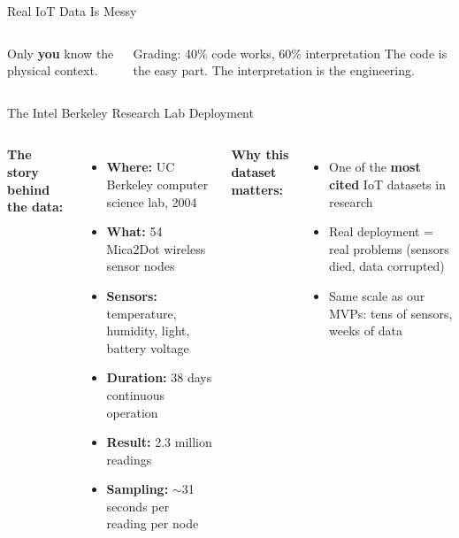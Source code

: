 \documentclass[aspectratio=169,11pt]{beamer}
\begin{document}
\begin{frame}[shrink=5]{Real IoT Data Is Messy}
\begin{columns}
{\begin{minipage}{0.9\textwidth}
            \vspace{0.1cm}
            Only \textbf{you} know the physical context.
            \vspace{0.1cm}
        \end{minipage}
        }

        \vspace{0.1cm}
        \begin{alertblock}{Grading: 40\% code works, 60\% interpretation}
            \small
            The code is the easy part. The interpretation is the engineering.
        \end{alertblock}
    \end{columns}
\end{frame}

\begin{frame}[shrink=5]{The Intel Berkeley Research Lab Deployment}
    \begin{columns}
        \textbf{The story behind the data:}

        \vspace{0.15cm}
        \begin{itemize}
            \item \textbf{Where:} UC Berkeley computer science lab, 2004
            \item \textbf{What:} 54 Mica2Dot wireless sensor nodes
            \item \textbf{Sensors:} temperature, humidity, light, battery voltage
            \item \textbf{Duration:} 38 days continuous operation
            \item \textbf{Result:} 2.3 million readings
            \item \textbf{Sampling:} $\sim$31 seconds per reading per node
        \end{itemize}

        \vspace{0.15cm}
        \textbf{Why this dataset matters:}
        \begin{itemize}
            \item One of the \textbf{most cited} IoT datasets in research
            \item Real deployment = real problems (sensors died, data corrupted)
            \item Same scale as our MVPs: tens of sensors, weeks of data
        \end{itemize}

\end{columns}
\end{frame}
\end{document}

